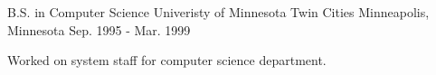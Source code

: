 

\begin{cventries}

  \cventry
    {B.S. in Computer Science} %
    {Univeristy of Minnesota Twin Cities} %
    {Minneapolis, Minnesota} %
    {Sep. 1995 - Mar. 1999} %
    {
      \begin{cvitems} %
        \item {Worked on system staff for computer science department.}
      \end{cvitems}
    }

\end{cventries}
